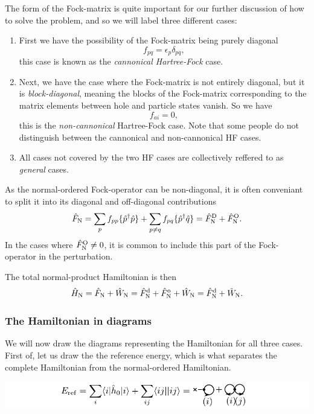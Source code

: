 \documentclass[a4paper, 11pt, notitlepage, english]{article}
\newcommand{\op}[1]{\hat{#1}}
\newcommand{\eps}{\epsilon}
\begin{document}
The form of the Fock-matrix is quite important for our further discussion of how to solve the problem, and so we will label three different cases:
\begin{enumerate}
	\item First we have the possibility of the Fock-matrix being purely diagonal
	$$f_{pq} = \eps_p \delta_{pq},$$
	this case is known as the \emph{cannonical Hartree-Fock} case.
	\item Next, we have the case where the Fock-matrix is not entirely diagonal, but it is \emph{block-diagonal}, meaning the blocks of the Fock-matrix corresponding to the matrix elements between hole and particle states vanish. So we have
	$$f_{ai} = 0,$$
	this is the \emph{non-cannonical} Hartree-Fock case. Note that some people do not distinguish between the cannonical and non-cannonical HF cases.
	\item All cases not covered by the two HF cases are collectively reffered to as \emph{general} cases.
\end{enumerate}
As the normal-ordered Fock-operator can be non-diagonal, it is often conveniant to split it into its diagonal and off-diagonal contributions
$$\op{F}_{\rm N} = \sum_p f_{pp}\{\op{p}^\dagger \op{p}\} + \sum_{p\neq q} f_{pq}\{\op{p}^\dagger \op{q}\} = \op{F}_{\rm N}^{\rm D} + \op{F}_{\rm N}^{\rm O}.$$
In the cases where $\op{F}_{\rm N}^{\rm O} \neq 0$, it is common to include this part of the Fock-operator in the perturbation.

The total normal-product Hamiltonian is then
$$\op{H}_{\rm N} = \op{F}_{\rm N} + \op{W}_{\rm N} = \op{F}^{\rm d}_{\rm N} + \op{F}^{\rm o}_{\rm N} + \op{W}_{\rm N} = \op{F}^{\rm d}_{\rm N} + \tilde{W}_{\rm N}.$$

\subsubsection*{The Hamiltonian in diagrams}

We will now draw the diagrams representing the Hamiltonian for all three cases. First of, let us draw the the reference energy, which is what separates the complete Hamiltonian from the normal-ordered Hamiltonian.

\begin{centering}
\includegraphics[width=\textwidth]{project2_4a}
\end{centering}
\end{document}
